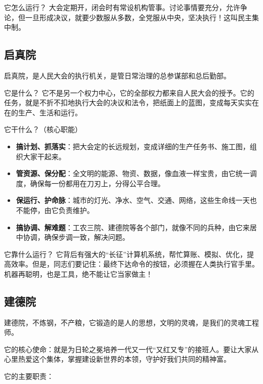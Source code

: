 它怎么运行？ 大会定期开，闭会时有常设机构管事。讨论事情要充分，允许争论，但一旦形成决议，就要少数服从多数，全党服从中央，坚决执行！这叫民主集中制。

\subsection{启真院}\label{ux542fux771fux9662}

启真院，是人民大会的执行机关，是管日常治理的总参谋部和总后勤部。

它是什么？ 它不是另一个权力中心，它的全部权力都来自人民大会的授予。它的任务，就是不折不扣地执行大会的决议和法令，把纸面上的蓝图，变成每天实实在在的生产、生活和运行。

它干什么？（核心职能）

\begin{itemize}
\item
  \textbf{搞计划、抓落实}：把大会定的长远规划，变成详细的生产任务书、施工图，组织大家干起来。
\item
  \textbf{管资源、保分配}：全文明的能源、物资、数据，像血液一样宝贵，由它统一调度，确保每一份都用在刀刃上，分得公平合理。
\item
  \textbf{保运行、护命脉}：城市的灯光、净水、空气、交通、网络，这些生命线一天也不能停，由它负责维护。
\item
  \textbf{搞协调、解难题}：工农三院、建德院等各个部门，就像不同的兵种，由它来居中协调，确保步调一致，解决问题。
\end{itemize}

它靠什么运行？ 它背后有强大的``长征''计算机系统，帮忙算账、模拟、优化，提高效率。但是，同志们要记住：最终下达命令的按钮，必须握在人类执行官手里。机器再聪明，也是工具，绝不能让它当家做主！

\subsection{建德院}\label{ux5efaux5fb7ux9662}

建德院，不炼钢，不产粮，它锻造的是人的思想，文明的灵魂，是我们的灵魂工程师。

它的核心使命：就是为日轮之冕培养一代又一代``又红又专''的接班人。要让大家从心里热爱这个集体，掌握建设新世界的本领，守护好我们共同的精神富。

它的主要职责：

